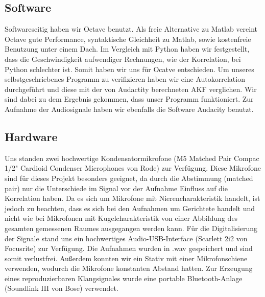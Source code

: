 \subsection{Software}
Softwareseitig haben wir Octave benutzt. Als freie Alternative zu Matlab vereint Octave gute Performance, syntaktische Gleichheit zu Matlab, sowie kostenfreie Benutzung unter einem Dach. Im Vergleich mit Python haben wir festgestellt, dass die Geschwindigkeit aufwendiger Rechnungen, wie der Korrelation, bei Python schlechter ist. Somit haben wir uns für Ocatve entschieden. Um unseres selbstgeschriebenes Programm zu verifizieren haben wir eine Autokorrelation durchgeführt und diese mit der von Audactity berechneten AKF verglichen. Wir sind dabei zu dem Ergebnis gekommen, dass unser Programm funktioniert. Zur Aufnahme der Audiosignale haben wir ebenfalls die Software Audacity benutzt.
\subsection{Hardware}
Uns standen zwei hochwertige Kondensatormikrofone (M5 Matched Pair Compac 1/2" Cardioid Condenser Microphones von Rode) zur Verfügung. Diese Mikrofone sind für dieses Projekt besonders geeignet, da durch die Abstimmung (matched pair) nur die Unterschiede im Signal vor der Aufnahme Einfluss auf die Korrelation haben. Da es sich um Mikrofone mit Nierencharakteristik handelt, ist jedoch zu beachten, dass es sich bei den Aufnahmen um Gerichtete handelt und nicht wie bei Mikrofonen mit Kugelcharakteristik von einer Abbildung des gesamten gemessenen Raumes ausgegangen werden kann. Für die Digitalisierung der Signale stand uns ein hochwertiges Audio-USB-Interface (Scarlett 2i2 von Focusrite) zur Verfügung. Die Aufnahmen wurden in .wav gespeichert und sind somit verlustfrei. Außerdem konnten wir ein Stativ mit einer Mikrofonschiene verwenden, wodurch die Mikrofone konstanten Abstand hatten. Zur Erzeugung eines reproduzierbaren Klangsignales wurde eine portable Bluetooth-Anlage (Soundlink III von Bose) verwendet.
